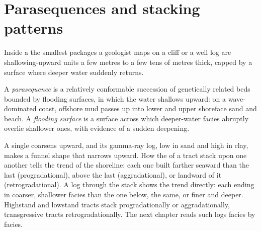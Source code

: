 \section{Parasequences and stacking patterns}\label{sec:b3:sequence-stratigraphy:parasequences}

Inside a  the smallest packages a geologist maps on a cliff or a
well log are shallowing-upward units a few metres to a few tens of metres
thick, capped by a surface where deeper water suddenly returns.

\begin{definition}\label{def:b3:sequence-stratigraphy:parasequence}
A \emph{parasequence} is a relatively conformable
succession of genetically related beds bounded by flooding surfaces, in which
the water shallows upward: on a wave-dominated coast, offshore mud passes up
into lower and upper shoreface sand and beach. A \emph{flooding
surface} is a surface across which deeper-water
facies abruptly overlie shallower ones, with evidence of a sudden deepening.
\end{definition}

A single  coarsens upward, and its gamma-ray log, low in sand
and high in clay, makes a funnel shape that narrows upward. How the
 of a tract stack upon one another tells the trend of the
shoreline: each one built farther seaward than the last (progradational),
above the last (aggradational), or landward of it (retrogradational). A log
through the stack shows the trend directly: each  ending in
coarser, shallower facies than the one below, the same, or finer and deeper.
Highstand and lowstand tracts stack progradationally or aggradationally,
transgressive tracts retrogradationally. The next chapter reads such logs
facies by facies.

